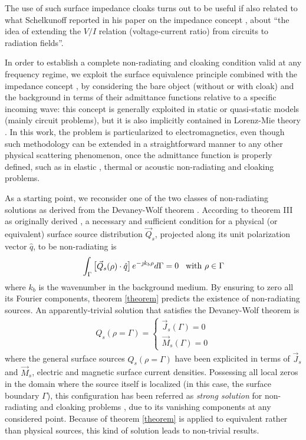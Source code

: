 \documentclass[reprint, showpacs, amsmath,amssymb, aps,
prb]{revtex4-1}
\begin{document}
The use of such surface impedance cloaks turns out to be useful if also related to what Schelkunoff reported in his paper on the impedance concept \cite{Imp_Gen}, about ``the idea of extending the $V/I$  relation (voltage-current ratio) from circuits to radiation fields''.

In order to establish a complete non-radiating and cloaking condition valid at any frequency regime, we exploit the surface equivalence principle\cite{Schelkunoff_1} combined with the impedance concept \cite{Imp_Gen}, by considering the bare object (without or with cloak) and the background in terms of their admittance functions relative to a specific incoming wave: this concept is generally exploited in static or quasi-static models (mainly circuit problems), but it is  also implicitly contained in Lorenz-Mie theory \cite{Bohren}. 
In this work, the problem is particularized to electromagnetics, even though such methodology can be extended in a straightforward manner to any other physical scattering phenomenon, once the admittance function is properly defined, such as in elastic  \cite{Elastic}, thermal \cite{Thermal} or acoustic  \cite{Acoustic} non-radiating and cloaking problems. 

As a starting point, we reconsider one of the two classes of non-radiating solutions as derived from the Devaney-Wolf theorem \cite{Laby_opex}. According to theorem III as originally derived \cite{Dev_Wolf}, a necessary and sufficient condition for a physical (or equivalent) surface source distribution $\vec{Q}_s$, projected along its unit polarization vector $\hat{q}$, to be non-radiating is
%
\begin{align}
\int_{\Gamma} \begin{bmatrix}\vec{Q}_s(\rho) \cdot \hat{q}\end{bmatrix} e^{-\jmath k_b \rho} d\Gamma=0 \hspace{3mm} \mbox{with $\rho \in \Gamma$}
\label{theorem}
\end{align}
%
where $k_b$ is the wavenumber in the background medium. By ensuring to zero all its Fourier components, theorem \eqref{theorem} predicts the existence of non-radiating sources. An apparently-trivial solution that satisfies the Devaney-Wolf theorem is  
%
\begin{align}
 Q_s(\rho=\Gamma)=\begin{cases}\vec{J}_s(\Gamma)=0\\
\vec{M}_s(\Gamma)=0\end{cases}
\label{strong}
\end{align}
%
where the general surface sources $Q_s(\rho=\Gamma)$ have been explicited in terms of $\vec{J}_s$ and $\vec{M}_s$, electric and magnetic surface current densities. Possessing all local zeros in the domain where the source itself is localized (in this case, the surface boundary $\Gamma$), this configuration has been referred as \textit{strong solution} for non-radiating and cloaking problems \cite{Laby_opex}, due to its vanishing components at any considered point. Because of theorem \eqref{theorem} is applied to equivalent rather than physical sources, this kind of solution leads to non-trivial results.
\end{document}
